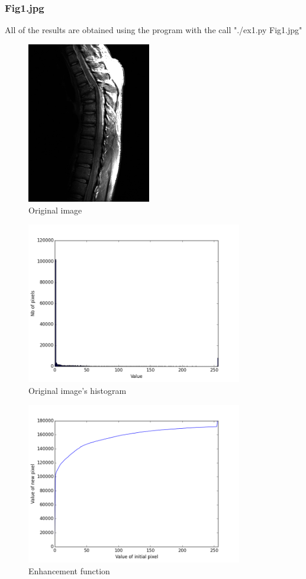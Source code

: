 \documentclass[10pt]{article}
\begin{document}
\subsubsection{Fig1.jpg}
All of the results are obtained using the program with the call "./ex1.py Fig1.jpg"
\begin{figure}[!ht]
	\centering
	\includegraphics[height=200pt]{./ex1/Fig1.jpg}
	\caption{Original image}
\end{figure}
\begin{figure}[!ht]
	\centering
	\includegraphics[height=200pt]{./ex1/Fig1_hist.png}
	\caption{Original image's histogram}
\end{figure}
\begin{figure}[!ht]
	\centering
	\includegraphics[height=200pt]{./ex1/Fig1_cdf.png}
	\caption{Enhancement function}
\end{figure}
\end{document}
